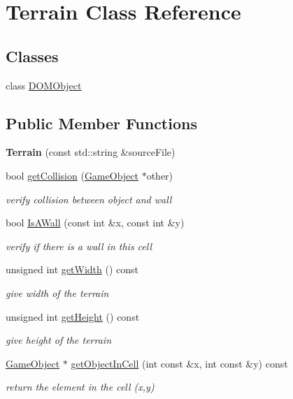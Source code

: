 \hypertarget{class_terrain}{}\section{Terrain Class Reference}
\label{class_terrain}
\subsection*{Classes}
\begin{DoxyCompactItemize}
\item 
class \hyperlink{class_terrain_1_1_d_o_m_object}{D\+O\+M\+Object}
\end{DoxyCompactItemize}
\subsection*{Public Member Functions}
\begin{DoxyCompactItemize}
\item 
{\bfseries Terrain} (const std\+::string \&source\+File)\hypertarget{class_terrain_ab58f28f01080863529be2be5059a9ae2}{}\label{class_terrain_ab58f28f01080863529be2be5059a9ae2}

\item 
bool \hyperlink{class_terrain_a4dbc413a6736ca0939ea342d4cf2155f}{get\+Collision} (\hyperlink{class_game_object}{Game\+Object} $\ast$other)
\begin{DoxyCompactList}\small\item\em verify collision between object and wall \end{DoxyCompactList}\item 
bool \hyperlink{class_terrain_a822320e686563e07301abc1c4ef1cb9f}{Is\+A\+Wall} (const int \&x, const int \&y)
\begin{DoxyCompactList}\small\item\em verify if there is a wall in this cell \end{DoxyCompactList}\item 
unsigned int \hyperlink{class_terrain_a79523f56e769e661d96b7910f6e4cb23}{get\+Width} () const 
\begin{DoxyCompactList}\small\item\em give width of the terrain \end{DoxyCompactList}\item 
unsigned int \hyperlink{class_terrain_a871a9554970fab92d4003e44663e30bd}{get\+Height} () const 
\begin{DoxyCompactList}\small\item\em give height of the terrain \end{DoxyCompactList}\item 
\hyperlink{class_game_object}{Game\+Object} $\ast$ \hyperlink{class_terrain_aeda05fd3caffde9f10501f7455895c18}{get\+Object\+In\+Cell} (int const \&x, int const \&y) const 
\begin{DoxyCompactList}\small\item\em return the element in the cell (x,y) \end{DoxyCompactList}\end{DoxyCompactItemize}
